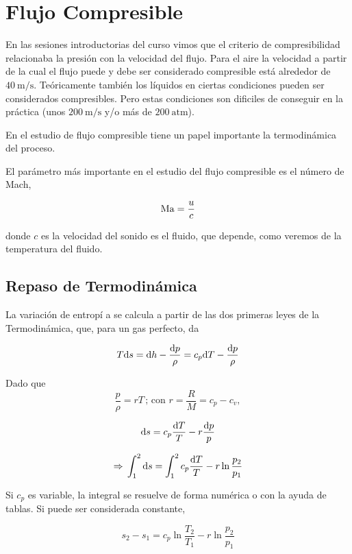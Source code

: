 \chapter{Flujo Compresible}

	
	En las sesiones introductorias del curso vimos que el criterio de
	compresibilidad relacionaba la presión con la velocidad del flujo.
	Para el aire la velocidad a partir de la cual el flujo puede y debe
	ser considerado compresible está alrededor de $40~\text{m/s}$. Teóricamente
	también los líquidos en ciertas condiciones pueden ser considerados
	compresibles. Pero estas condiciones son dificiles de conseguir en
	la práctica (unos $200~\text{m/s}$ y/o más de $200~\text{atm}$).
	
	En el estudio de flujo compresible tiene un papel importante la termodinámica
	del proceso.
	
	El parámetro más importante en el estudio del flujo compresible es
	el número de Mach, 
	
\begin{equation}
		\text{Ma}=\frac{u}{c}
\end{equation}
	
	donde $c$ es la velocidad del sonido es el fluido, que depende,
	como veremos de la temperatura del fluido.


\section{Repaso de Termodinámica}

	
	La variación de entropí a se calcula a partir de las dos primeras
	leyes de la Termodinámica, que, para un gas perfecto, da 
	
\begin{equation}
		T\text{d} s=\text{d} h-\frac{\text{d} p}{\rho}=c_{p}\text{d} T-\frac{\text{d} p}{\rho}
\end{equation}
	
	
	Dado que 
	\[
	\frac{p}{\rho}=rT\,;\,\text{con }r=\frac{R}{M}=c_{p}-c_{v},
	\]
	
	\[
	\text{d} s=c_{p}\frac{\text{d} T}{T}-r\frac{\text{d} p}{p}
	\]
	
	\[
	\Rightarrow\,\int_{1}^{2}\text{d} s=\int_{1}^{2}c_{p}\frac{\text{d} T}{T}-r\ln\frac{p_{2}}{p_{1}}
	\]
	
	
	Si $c_{p}$ es variable, la integral se resuelve de forma numérica
	o con la ayuda de tablas. Si puede ser considerada constante, 
	
\begin{equation}
		s_{2}-s_{1}=c_{p}\ln\frac{T_{2}}{T_{1}}-r\ln\frac{p_{2}}{p_{1}}
\end{equation}
	
